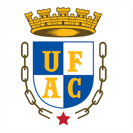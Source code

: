 \documentclass[
	12pt,				%
	openright,			%
	twoside,			%
	a4paper,			%
	english,			%
	french,				%
	spanish,			%
	brazil				%
	]{abntex2}
\begin{document}

\frenchspacing 


\begin{figure}
	\centering
	\includegraphics[width=.25\textwidth]{imagens/brasao_UFAC.png}	
	\label{fig:UFAC}
\end{figure}
\imprimircapa

\imprimirfolhaderosto*

%
%     
\end{document}
